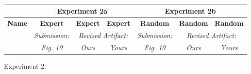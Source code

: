 \begin{figure}

\experimentTableSize

\begin{tabular}{l|cccccc}
& \multicolumn{3}{c}{\textbf{Experiment 2a}}
& \multicolumn{3}{c}{\textbf{Experiment 2b}} \\\hline
\textbf{Name} &
\textbf{Expert} & \textbf{Expert} & \textbf{Expert} &
\textbf{Random} & \textbf{Random} & \textbf{Random} \\
&
\textit{Submission:} & \multicolumn{2}{c}{\textit{Revised Artifact:}} &
\textit{Submission:} & \multicolumn{2}{c}{\textit{Revised Artifact:}} \\
&
\textit{Fig. 10} & \textit{Ours} & \textit{Yours} &
\textit{Fig. 10} & \textit{Ours} & \textit{Yours} \\

\end{tabular}

\caption{Experiment 2.}

\end{figure}
